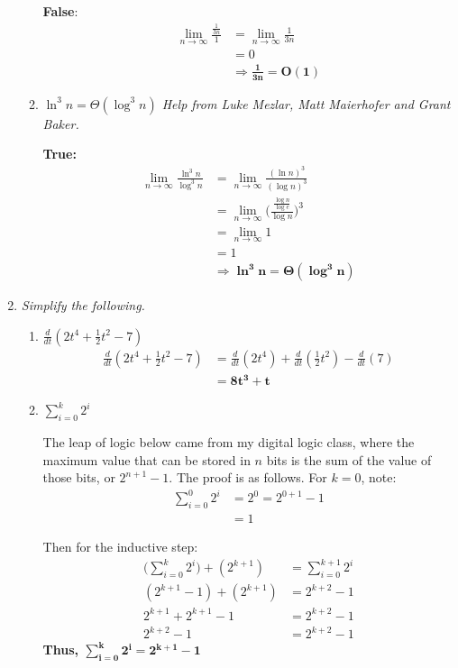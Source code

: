 \documentclass[12pt]{article}
\begin{document}
\begin{enumerate}
\begin{enumerate}
    \textbf{False}:
    \begin{align*}
    \lim_{n\to\infty} \frac{\frac{1}{3n}}{1} &= \lim_{n\to\infty} \frac{1}{3n} \\
    &= 0 \\
    &\Rightarrow \mathbf{\frac{1}{3n} = O(1)}
    \end{align*}
    
    \item \textit{$\ln^3n = \Theta(\log^3n)$ Help from Luke Mezlar, Matt Maierhofer and Grant Baker.}
    
    \textbf{True:}
	\begin{align*}
    \lim_{n\to\infty} \frac{\ln^3n}{\log^3n} &= \lim_{n\to\infty} \frac{(\ln n)^3}{
    (\log n)^3} \\
    &= \lim_{n\to\infty} \bigg(\frac{\frac{\log n}{\log e}}{\log n}\bigg)^3 \\
    &= \lim_{n\to\infty} 1 \\
    &= 1 \\
    &\Rightarrow \mathbf{\ln^3n = \Theta(\log^3n)}
    \end{align*}
    
	\end{enumerate}
	
    \newpage
	\item \textit{Simplify the following.}
    \begin{enumerate}
	\item \textit{$\frac{d}{dt}(2t^4 + \frac{1}{2}t^2 - 7)$}
	\begin{align*}
	\frac{d}{dt}(2t^4 + \frac{1}{2}t^2 - 7) &= \frac{d}{dt}(2t^4) + \frac{d}{dt}(\frac{1}{2}t^2) - \frac{d}{dt}(7) \\
    &= \mathbf{8t^3 + t}
	\end{align*}
    
	\item \textit{$\sum\limits_{i=0}^{k}2^i$}
	
    The leap of logic below came from my digital logic class, where the maximum value that can be stored in $n$ bits is the sum of the value of those bits, or $2^{n+1}-1$. The proof is as follows.
    For $k=0$, note:
    \begin{align*}
    \sum\limits_{i=0}^{0}2^i &= 2^0 = 2^{0+1} - 1 \\
    &= 1
    \end{align*}
	
    Then for the inductive step:
    \begin{align*}
    \Bigg(\sum\limits_{i=0}^{k}2^i\Bigg) + (2^{k+1}) &= \sum\limits_{i=0}^{k+1}2^i \\
    (2^{k+1}-1) + (2^{k+1}) &= 2^{k+2}-1 \\
    2^{k+1} + 2^{k+1} - 1 &= 2^{k+2} - 1 \\
    2^{k+2} - 1 &= 2^{k+2} - 1
    \end{align*}
    \textbf{Thus, $\mathbf{\sum\limits_{i=0}^{k}2^i = 2^{k+1}-1}$}


\end{enumerate}
\end{enumerate}
\end{document}
